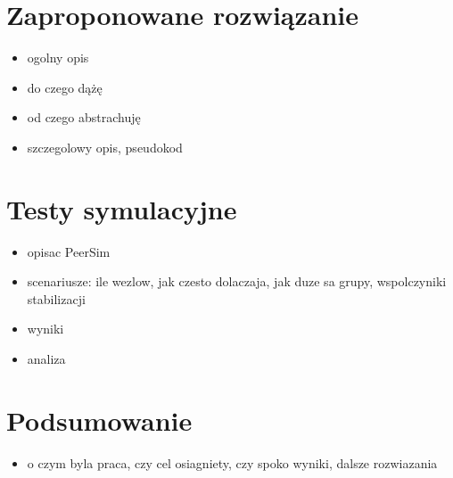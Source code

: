 \documentclass[12pt, twoside, openany]{report}
\begin{document}
\chapter{Zaproponowane rozwiązanie}
\label{rozdzial_rozwiazanie}
\begin{itemize}
\item ogolny opis
\item do czego dążę
\item od czego abstrachuję
\item szczegolowy opis, pseudokod
\end{itemize}


\chapter{Testy symulacyjne}

\begin{itemize}
\item opisac PeerSim
\item scenariusze: ile wezlow, jak czesto dolaczaja, jak duze sa grupy, wspolczyniki stabilizacji
\item wyniki
\item analiza
\end{itemize}

\chapter{Podsumowanie}

\begin{itemize}
\item o czym byla praca, czy cel osiagniety, czy spoko wyniki, dalsze rozwiazania
\end{itemize}


\end{document}
